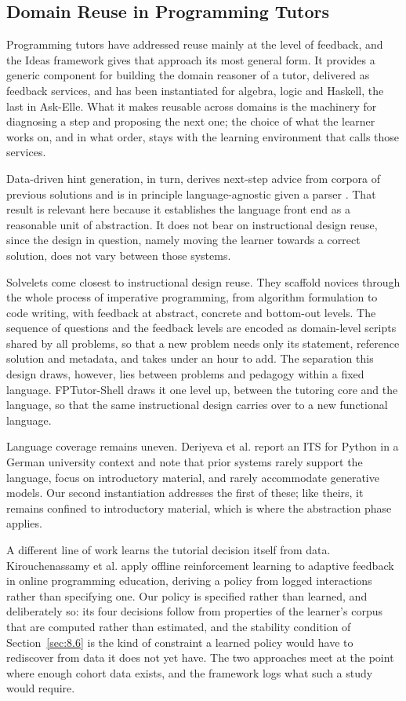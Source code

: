 \documentclass[journal]{IEEEtran}
\begin{document}
\subsection{Domain Reuse in Programming Tutors}\label{sec:2.3}
Programming tutors have addressed reuse mainly at the level of feedback, and the Ideas framework \cite{b13} gives that approach its most general form. It provides a generic component for building the domain reasoner of a tutor, delivered as feedback services, and has been instantiated for algebra, logic and Haskell, the last in Ask-Elle. What it makes reusable across domains is the machinery for diagnosing a step and proposing the next one; the choice of what the learner works on, and in what order, stays with the learning environment that calls those services.

Data-driven hint generation, in turn, derives next-step advice from corpora of
previous solutions and is in principle language-agnostic given a parser
\cite{b14,b15}. That result is relevant here because it establishes
the language front end as a reasonable unit of abstraction. It does not
bear on instructional design reuse, since the design in question, namely
moving the learner towards a correct solution, does not vary between
those systems.

Solvelets \cite{b12} come closest to instructional design reuse. They scaffold novices through the whole process of imperative programming, from algorithm formulation to code writing, with feedback at abstract, concrete and bottom-out levels. The sequence of questions and the feedback levels are encoded as domain-level scripts shared by all problems, so that a new problem needs only its statement, reference solution and metadata, and takes under an hour to add. The separation this design draws, however, lies between problems and pedagogy within a fixed language. FPTutor-Shell draws it one level up, between the tutoring core and the language, so that the same instructional design carries over to a new functional language.

Language coverage remains uneven. Deriyeva et al. \cite{b16} report an ITS for
Python in a German university context and note that prior systems rarely
support the language, focus on introductory material, and rarely accommodate
generative models. Our second instantiation addresses the first of these; like theirs, it remains confined to introductory material, which is where the abstraction phase applies.

A different line of work learns the tutorial decision itself from data.
Kirouchenassamy et al. \cite{b17} apply offline reinforcement learning to
adaptive feedback in online programming education, deriving a policy from
logged interactions rather than specifying one. Our policy is specified
rather than learned, and deliberately so: its four decisions follow from
properties of the learner's corpus that are computed rather than
estimated, and the stability condition of Section~\ref{sec:8.6} is the kind of
constraint a learned policy would have to rediscover from data it does not
yet have. The two approaches meet at the point where enough cohort data
exists, and the framework logs what such a study would require.
\end{document}

